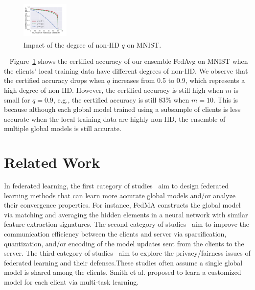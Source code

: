 \documentclass[letterpaper]{article} %
\newcommand{\myparatight}[1]{\smallskip\noindent{\bf {#1}:}~}
\begin{document}
\begin{figure}[!t]
\center
\includegraphics[width=0.20700000000000002\textwidth,height=0.76in ]{./figs/mnist/mnist_cnn_k10_bias.pdf}
\caption{Impact of the degree of non-IID $q$ on MNIST.}
\label{fig:q}
\end{figure}

\myparatight{Impact of degree of non-IID $q$} Figure~\ref{fig:q} shows the certified accuracy of our ensemble FedAvg on MNIST when the clients' local training data have different degrees of non-IID. We observe that the certified accuracy drops when $q$ increases from 0.5 to 0.9, which represents a high degree of non-IID. However, the certified accuracy is still high when $m$ is small for $q=0.9$, e.g., the certified accuracy is still 83\% when $m=10$.  This is because  although each global model trained using a subsample of clients is less accurate when the local training data are highly non-IID, the ensemble of multiple global models is still accurate.


\section{Related Work}
In federated learning, the first category of studies~\cite{smith2017federated,li2019convergence,wang2020federated,liu2020federated,peng2019federated} aim to design  federated learning methods that can learn more accurate global models and/or analyze their convergence properties. For instance, FedMA \cite{wang2020federated} constructs the global model via matching and averaging the hidden elements in a neural network with similar feature extraction signatures. The second category of studies~\cite{konevcny2016federated,mcmahan2016communication,wen2017terngrad,alistarh2017qsgd,lee2017speeding,sahu2018convergence,bernstein2018signsgd,vogels2019powersgd,yurochkin2019bayesian,mohri2019agnostic,wang2020federated,li2020practical,li2020acceleration,hamer2020fedboost,rothchildfetchsgd,malinovsky2020local} aim to improve the communication efficiency between the clients and server via sparsification, quantization, and/or encoding of the model updates sent from the clients to the server. The third category of studies~\cite{bonawitz2017practical,geyer2017differentially,hitaj2017deep,melis2019exploiting,zhu2019deep,mohri2019agnostic,wang2020federatedlatent,Li2020Fair} aim to explore the privacy/fairness issues of federated learning and their defenses.These studies often assume a single global model is shared among the clients.  Smith et al. \cite{smith2017federated} proposed to learn a customized model for each client via multi-task learning.
\end{document}
